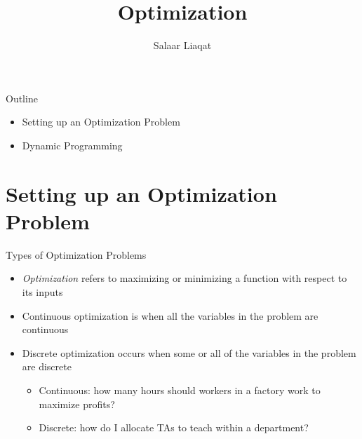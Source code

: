 \documentclass[
  ignorenonframetext,
]{beamer}
\title{Optimization}
\author{Salaar Liaqat}
\date{}
\institute{Data Sciences Institute, UofT}
\begin{document}
\frame{\titlepage}
\ifdefined\Shaded\renewenvironment{Shaded}{\begin{tcolorbox}[interior hidden, borderline west={3pt}{0pt}{shadecolor}, enhanced, sharp corners, breakable, boxrule=0pt, frame hidden]}{\end{tcolorbox}}\fi

\begin{frame}{Outline}
\protect\hypertarget{outline}{}
\begin{itemize}
\item
  Setting up an Optimization Problem
\item
  Dynamic Programming
\end{itemize}
\end{frame}

\hypertarget{setting-up-an-optimization-problem}{%
\section{Setting up an Optimization
Problem}\label{setting-up-an-optimization-problem}}

\begin{frame}{Types of Optimization Problems}
\protect\hypertarget{types-of-optimization-problems}{}
\begin{itemize}
\item
  \emph{Optimization} refers to maximizing or minimizing a function with
  respect to its inputs
\item
  Continuous optimization is when all the variables in the problem are
  continuous
\item
  Discrete optimization occurs when some or all of the variables in the
  problem are discrete

  \begin{itemize}
  \item
    Continuous: how many hours should workers in a factory work to
    maximize profits?
  \item
    Discrete: how do I allocate TAs to teach within a department?
  \end{itemize}
\end{itemize}
\end{frame}
\end{document}
